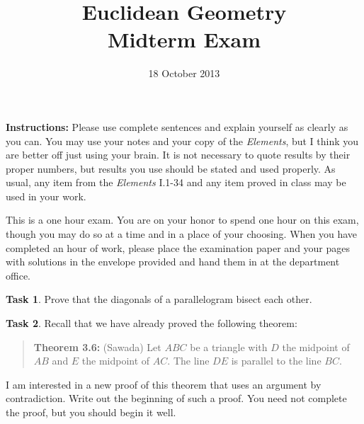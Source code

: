 \documentclass[11pt]{amsart}
\theoremstyle{definition}
\newtheorem{task}{Task}
\begin{document}
\title{Euclidean Geometry\\ Midterm Exam}
\author{18 October 2013}
\maketitle


\noindent
\textbf{Instructions:} Please use complete sentences and explain yourself as clearly as you can.
You may use your notes and your copy of the \emph{Elements}, but I think you are better off just using your brain.
It is not necessary to quote results by their proper numbers, but results you use should be stated and used properly.
As usual, any item from the \emph{Elements} I.1-34 and any item proved in class may be used in your work.

This is a one hour exam.
You are on your honor to spend one hour on this exam, though you may do so at a time and in a place of your choosing.
When you have completed an hour of work, please place the examination paper and your pages with solutions in the envelope provided and hand them in at the department office.



\begin{task}
Prove that the diagonals of a parallelogram bisect each other.
\end{task}

\begin{task}\label{contradiction}
Recall that we have already proved the following theorem:
\begin{quote}
\textbf{Theorem 3.6:} (Sawada) Let $ABC$ be a triangle with $D$ the midpoint of $AB$ and $E$ the midpoint of $AC$.
The line $DE$ is parallel to the line $BC$.
\end{quote}
I am interested in a new proof of this theorem that uses an argument by contradiction.
Write out the beginning of such a proof.
You need not complete the proof, but you should begin it well.
\end{task}
\end{document}

